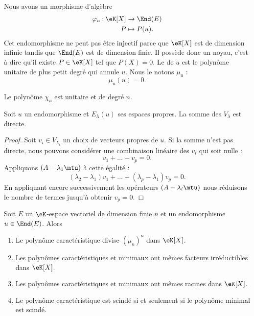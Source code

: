 Nous avons un morphisme d'algèbre
\begin{equation}
    \begin{aligned}
        \varphi_u\colon\eK[X]&\to \End(E) \\
        P&\mapsto P(u). 
    \end{aligned}
\end{equation}
Cet endomorphisme ne peut pas être injectif parce que \(\eK[X]\) est de dimension infinie tandis que \( \End(E)\) est de dimension finie. Il possède donc un noyau, c'est à dire qu'il existe \( P\in\eK[X]\) tel que \( P(X)=0\). Le  de \( u\) est le polynôme unitaire de plus petit degré qui annule \( u\). Nous le notons \( \mu_u\) :
\begin{equation}
    \mu_u(u)=0.
\end{equation}

\begin{lemma}
    Le polynôme \( \chi_u\) est unitaire et de degré \( n\).
\end{lemma}

\begin{lemma}       \label{LemjcztYH}
    Soit \( u\) un endomorphisme et \( E_{\lambda}(u)\) ses espaces propres. La somme des \( V_{\lambda}\) est directe.
\end{lemma}

\begin{proof}
    Soit \( v_i\in V_{\lambda_i}\) un choix de vecteurs propres de \( u\). Si la somme n'est pas directe, nous pouvons considérer une combinaison linéaire des \( v_i\) qui soit nulle :
    \begin{equation}
        v_1+\ldots+v_p=0.
    \end{equation}
    Appliquons \( (A-\lambda_1\mtu)\) à cette égalité :
    \begin{equation}
        (\lambda_2-\lambda_1)v_1+\ldots+(\lambda_p-\lambda_1)v_p=0.
    \end{equation}
    En appliquant encore successivement les opérateurs \( (A-\lambda_i\mtu)\) nous réduisons le nombre de termes jusqu'à obtenir \( v_p=0\).
\end{proof}


\begin{theorem}     \label{ThoNhbrUL}
    Soit \( E\) un \(\eK\)-espace vectoriel de dimension finie \( n\) et un endomorphisme \( u\in\End(E)\). Alors
    \begin{enumerate}
        \item
            Le polynôme caractéristique divise \( (\mu_u)^n\) dans \(\eK[X]\).
        \item
            Les polynômes caractéristiques et minimaux ont mêmes facteurs irréductibles dans \(\eK[X]\).
        \item
            Les polynômes caractéristiques et minimaux ont mêmes racines dans \(\eK[X]\).
        \item
            Le polynôme caractéristique est scindé si et seulement si le polynôme minimal est scindé.
    \end{enumerate}
\end{theorem}


